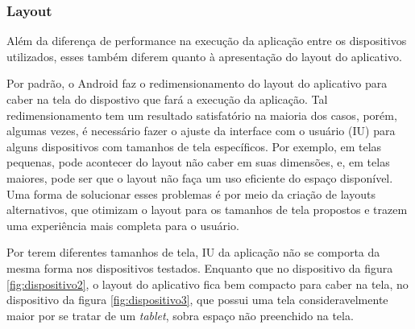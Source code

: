 \subsubsection{Layout}

Além da diferença de performance na execução da aplicação entre os dispositivos utilizados, esses também diferem quanto à apresentação do layout do aplicativo. 

Por padrão, o Android faz o redimensionamento do layout do aplicativo para caber na tela do dispostivo que fará a execução da aplicação. Tal redimensionamento tem um resultado satisfatório na maioria dos casos, porém, algumas vezes, é necessário fazer o ajuste da interface com o usuário (IU) para alguns dispositivos com tamanhos de tela específicos. Por exemplo, em telas pequenas, pode acontecer do layout não caber em suas dimensões, e, em telas maiores, pode ser que o layout não faça um uso eficiente do espaço disponível. Uma forma de solucionar esses problemas é por meio da criação de layouts alternativos, que otimizam o layout para os tamanhos de tela propostos e trazem uma experiência mais completa para o usuário. 

Por terem diferentes tamanhos de tela, IU da aplicação não se comporta da mesma forma nos dispositivos testados. Enquanto que no dispositivo da figura \ref{fig:dispositivo2}, o layout do aplicativo fica bem compacto para caber na tela, no dispositivo da figura \ref{fig:dispositivo3}, que possui uma tela consideravelmente maior por se tratar de um \textit{tablet}, sobra espaço não preenchido na tela.